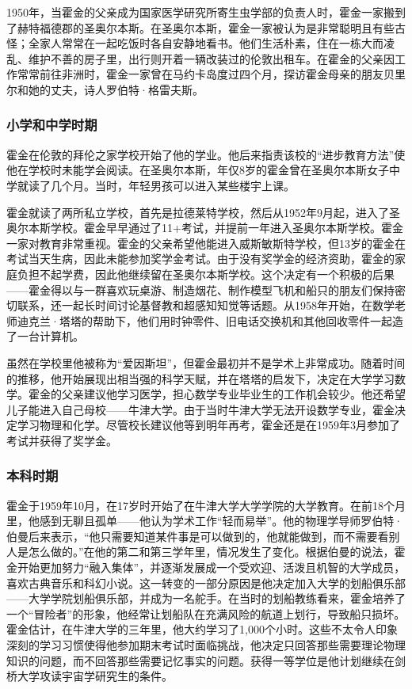 1950年，当霍金的父亲成为国家医学研究所寄生虫学部的负责人时，霍金一家搬到了赫特福德郡的圣奥尔本斯。在圣奥尔本斯，霍金一家被认为是非常聪明且有些古怪；全家人常常在一起吃饭时各自安静地看书。他们生活朴素，住在一栋大而凌乱、维护不善的房子里，出行则开着一辆改装过的伦敦出租车。在霍金的父亲因工作常常前往非洲时，霍金一家曾在马约卡岛度过四个月，探访霍金母亲的朋友贝里尔和她的丈夫，诗人罗伯特·格雷夫斯。
\subsubsection{小学和中学时期}  
霍金在伦敦的拜伦之家学校开始了他的学业。他后来指责该校的“进步教育方法”使他在学校时未能学会阅读。在圣奥尔本斯，年仅8岁的霍金曾在圣奥尔本斯女子中学就读了几个月。当时，年轻男孩可以进入某些楼宇上课。

霍金就读了两所私立学校，首先是拉德莱特学校，然后从1952年9月起，进入了圣奥尔本斯学校。霍金早早通过了11+考试，并提前一年进入圣奥尔本斯学校。霍金一家对教育非常重视。霍金的父亲希望他能进入威斯敏斯特学校，但13岁的霍金在考试当天生病，因此未能参加奖学金考试。由于没有奖学金的经济资助，霍金的家庭负担不起学费，因此他继续留在圣奥尔本斯学校。这个决定有一个积极的后果——霍金得以与一群喜欢玩桌游、制造烟花、制作模型飞机和船只的朋友们保持密切联系，还一起长时间讨论基督教和超感知知觉等话题。从1958年开始，在数学老师迪克兰·塔塔的帮助下，他们用时钟零件、旧电话交换机和其他回收零件一起造了一台计算机。

虽然在学校里他被称为“爱因斯坦”，但霍金最初并不是学术上非常成功。随着时间的推移，他开始展现出相当强的科学天赋，并在塔塔的启发下，决定在大学学习数学。霍金的父亲建议他学习医学，担心数学专业毕业生的工作机会较少。他还希望儿子能进入自己母校——牛津大学。由于当时牛津大学无法开设数学专业，霍金决定学习物理和化学。尽管校长建议他等到明年再考，霍金还是在1959年3月参加了考试并获得了奖学金。
\subsubsection{本科时期}
霍金于1959年10月，在17岁时开始了在牛津大学大学学院的大学教育。在前18个月里，他感到无聊且孤单——他认为学术工作“轻而易举”。他的物理学导师罗伯特·伯曼后来表示，“他只需要知道某件事是可以做到的，他就能做到，而不需要看别人是怎么做的。”在他的第二和第三学年里，情况发生了变化。根据伯曼的说法，霍金开始更加努力“融入集体”，并逐渐发展成一个受欢迎、活泼且机智的大学成员，喜欢古典音乐和科幻小说。这一转变的一部分原因是他决定加入大学的划船俱乐部——大学学院划船俱乐部，并成为一名舵手。在当时的划船教练看来，霍金培养了一个“冒险者”的形象，他经常让划船队在充满风险的航道上划行，导致船只损坏。霍金估计，在牛津大学的三年里，他大约学习了1,000个小时。这些不太令人印象深刻的学习习惯使得他参加期末考试时面临挑战，他决定只回答那些需要理论物理知识的问题，而不回答那些需要记忆事实的问题。获得一等学位是他计划继续在剑桥大学攻读宇宙学研究生的条件。


